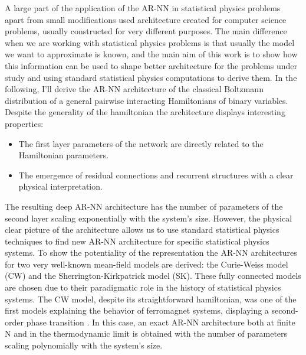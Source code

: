 \documentclass[aps,physrev,10pt,floatfix,reprint]{revtex4-2}
\begin{document}
A large part of the application of the AR-NN in statistical physics problems apart from small modifications used architecture created for computer science problems, usually constructed for very different purposes. The main difference when we are working with statistical physics problems is that usually the model we want to approximate is known, and the main aim of this work is to show how this information can be used to shape better architecture for the problems under study and using standard statistical physics computations to derive them. In the following, I'll derive the AR-NN architecture of the classical Boltzmann distribution of a general pairwise interacting Hamiltonians of binary variables. Despite the generality of the hamiltonian the architecture displays interesting properties:
\begin{itemize}
    \item The first layer parameters of the network are directly related to the Hamiltonian parameters.
    \item The emergence of residual connections and recurrent structures with a clear physical interpretation.
\end{itemize}
The resulting deep AR-NN architecture has the number of parameters of the second layer scaling exponentially with the system's size. 
However, the physical clear picture of the architecture allows us to use standard statistical physics techniques to find new AR-NN architecture for specific statistical physics systems. To show the potentiality of the representation the AR-NN architectures for two very well-known mean-field models are derived: the Curie-Weiss model (CW) and the Sherrington-Kirkpatrick model (SK). These fully connected models are chosen due to their paradigmatic role in the history of statistical physics systems. The CW model, despite its straightforward hamiltonian, was one of the first models explaining the behavior of ferromagnet systems, displaying a second-order phase transition \cite{kadanoff2000statistical}. In this case, an exact AR-NN architecture both at finite N and in the thermodynamic limit is obtained with the number of parameters scaling polynomially with the system's size.
\end{document}

